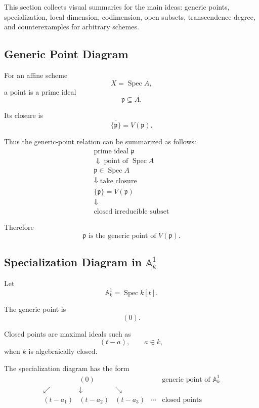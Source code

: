 \documentclass[12pt,a4paper]{article}
\theoremstyle{notespace}
\begin{document}
This section collects visual summaries for the main ideas: generic points, specialization, local dimension, codimension, open subsets, transcendence degree, and counterexamples for arbitrary schemes.

\subsection{Generic Point Diagram}

For an affine scheme
\[
X=\operatorname{Spec} A,
\]
a point is a prime ideal
\[
\mathfrak p\subseteq A.
\]

Its closure is
\[
\overline{\{\mathfrak p\}}=V(\mathfrak p).
\]

Thus the generic-point relation can be summarized as follows:
\[
\begin{array}{c}
	\text{prime ideal } \mathfrak p
	\\[0.5em]
	\Downarrow\ \text{point of } \operatorname{Spec} A
	\\[0.5em]
	\mathfrak p\in \operatorname{Spec} A
	\\[0.5em]
	\Downarrow\ \text{take closure}
	\\[0.5em]
	\overline{\{\mathfrak p\}}=V(\mathfrak p)
	\\[0.5em]
	\Downarrow
	\\[0.5em]
	\text{closed irreducible subset}
\end{array}
\]

Therefore
\[
\boxed{
	\mathfrak p \text{ is the generic point of } V(\mathfrak p).
}
\]

\subsection{Specialization Diagram in \(\mathbb A^1_k\)}

Let
\[
\mathbb A^1_k=\operatorname{Spec} k[t].
\]

The generic point is
\[
(0).
\]

Closed points are maximal ideals such as
\[
(t-a),\qquad a\in k,
\]
when \(k\) is algebraically closed.

The specialization diagram has the form
\[
\begin{array}{ccccc}
	& (0) & & & \text{generic point of } \mathbb A^1_k
	\\[0.8em]
	\swarrow & \downarrow & \searrow
	\\[0.8em]
	(t-a_1) & (t-a_2) & (t-a_3) & \cdots & \text{closed points}
\end{array}
\]
\end{document}
